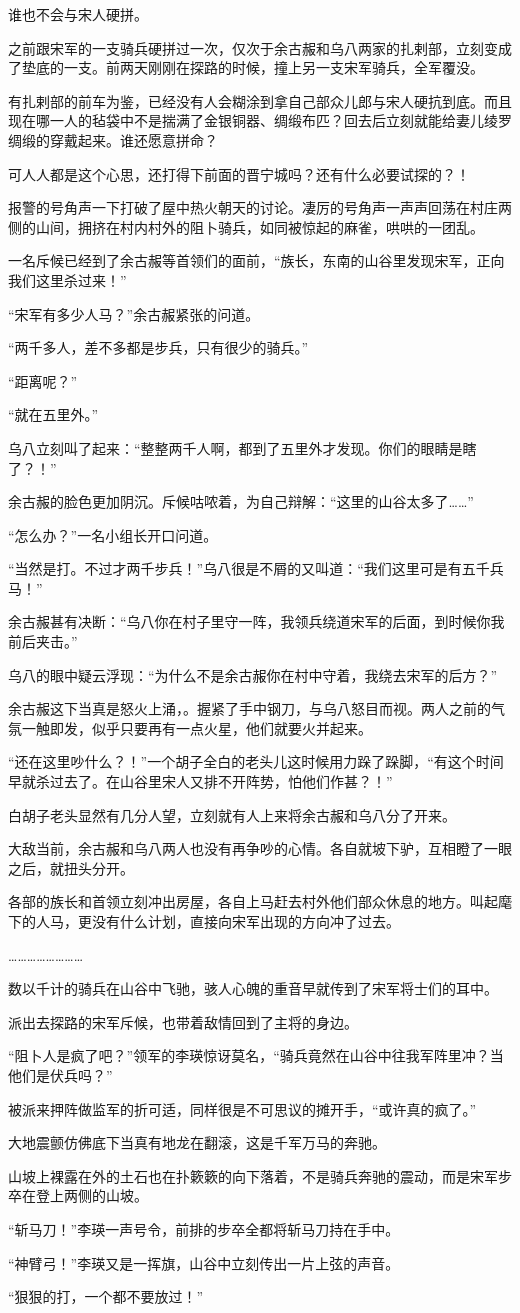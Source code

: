谁也不会与宋人硬拼。

之前跟宋军的一支骑兵硬拼过一次，仅次于余古赧和乌八两家的扎剌部，立刻变成了垫底的一支。前两天刚刚在探路的时候，撞上另一支宋军骑兵，全军覆没。

有扎剌部的前车为鉴，已经没有人会糊涂到拿自己部众儿郎与宋人硬抗到底。而且现在哪一人的毡袋中不是揣满了金银铜器、绸缎布匹？回去后立刻就能给妻儿绫罗绸缎的穿戴起来。谁还愿意拼命？

可人人都是这个心思，还打得下前面的晋宁城吗？还有什么必要试探的？！

报警的号角声一下打破了屋中热火朝天的讨论。凄厉的号角声一声声回荡在村庄两侧的山间，拥挤在村内村外的阻卜骑兵，如同被惊起的麻雀，哄哄的一团乱。

一名斥候已经到了余古赧等首领们的面前，“族长，东南的山谷里发现宋军，正向我们这里杀过来！”

“宋军有多少人马？”余古赧紧张的问道。

“两千多人，差不多都是步兵，只有很少的骑兵。”

“距离呢？”

“就在五里外。”

乌八立刻叫了起来：“整整两千人啊，都到了五里外才发现。你们的眼睛是瞎了？！”

余古赧的脸色更加阴沉。斥候咕哝着，为自己辩解：“这里的山谷太多了……”

“怎么办？”一名小组长开口问道。

“当然是打。不过才两千步兵！”乌八很是不屑的又叫道：“我们这里可是有五千兵马！”

余古赧甚有决断：“乌八你在村子里守一阵，我领兵绕道宋军的后面，到时候你我前后夹击。”

乌八的眼中疑云浮现：“为什么不是余古赧你在村中守着，我绕去宋军的后方？”

余古赧这下当真是怒火上涌，。握紧了手中钢刀，与乌八怒目而视。两人之前的气氛一触即发，似乎只要再有一点火星，他们就要火并起来。

“还在这里吵什么？！”一个胡子全白的老头儿这时候用力跺了跺脚，“有这个时间早就杀过去了。在山谷里宋人又排不开阵势，怕他们作甚？！”

白胡子老头显然有几分人望，立刻就有人上来将余古赧和乌八分了开来。

大敌当前，余古赧和乌八两人也没有再争吵的心情。各自就坡下驴，互相瞪了一眼之后，就扭头分开。

各部的族长和首领立刻冲出房屋，各自上马赶去村外他们部众休息的地方。叫起麾下的人马，更没有什么计划，直接向宋军出现的方向冲了过去。

……………………

数以千计的骑兵在山谷中飞驰，骇人心魄的重音早就传到了宋军将士们的耳中。

派出去探路的宋军斥候，也带着敌情回到了主将的身边。

“阻卜人是疯了吧？”领军的李瑛惊讶莫名，“骑兵竟然在山谷中往我军阵里冲？当他们是伏兵吗？”

被派来押阵做监军的折可适，同样很是不可思议的摊开手，“或许真的疯了。”

大地震颤仿佛底下当真有地龙在翻滚，这是千军万马的奔驰。

山坡上裸露在外的土石也在扑簌簌的向下落着，不是骑兵奔驰的震动，而是宋军步卒在登上两侧的山坡。

“斩马刀！”李瑛一声号令，前排的步卒全都将斩马刀持在手中。

“神臂弓！”李瑛又是一挥旗，山谷中立刻传出一片上弦的声音。

“狠狠的打，一个都不要放过！”

